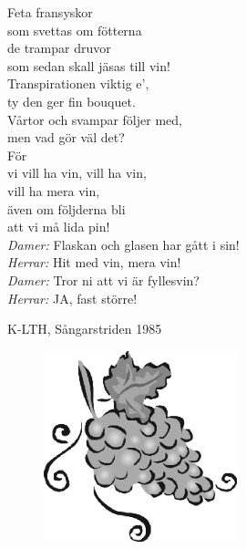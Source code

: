 \documentclass[a6paper,10pt]{article}
\begin{document}
\setlength{\oddsidemargin}{-0.47in}
\noindent
\begin{center}
\end{center}
\begin{lyrics}
Feta fransyskor \\
som svettas om fötterna\\
de trampar druvor \\
som sedan skall jäsas till vin!\\
Transpirationen viktig e', \\
ty den ger fin bouquet.\\
Vårtor och svampar följer med, \\
men vad gör väl det?\\
För \\
vi vill ha vin, vill ha vin, \\
vill ha mera vin,\\
även om följderna bli\\
att vi må lida pin!
\vspace{5pt}\\
\textit{Damer:} Flaskan och glasen har gått i sin!\\
\textit{Herrar:} Hit med vin, mera vin!\\
\textit{Damer:} Tror ni att vi är fyllesvin?\\
\textit{Herrar:} JA, fast större! 
\end{lyrics}
\begin{flushright}
K-LTH, Sångarstriden 1985
\end{flushright}
\vfill
\begin{figure}[!h]
\includegraphics[width=0.5\textwidth]{grapes.png}
\end{figure}
\end{document}
